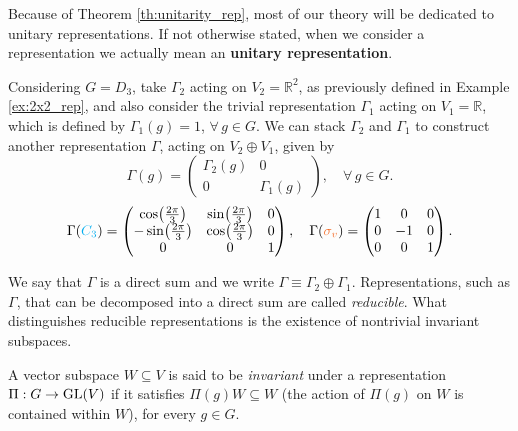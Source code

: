 Because of Theorem \ref{th:unitarity_rep}, most of our theory will be dedicated to unitary representations. If not otherwise stated, when we consider a representation we actually mean an \textbf{unitary representation}.

\begin{example} \label{ex:direct_sum}
Considering $G = D_3$, take $\Gamma_2$ acting on $V_2 = \mathbb{R}^2$, as previously defined in Example \ref{ex:2x2_rep}, and also consider the trivial representation $\Gamma_1$ acting on $V_1 = \mathbb{R}$, which is defined by $\Gamma_1(g) = 1$, $\forall \, g \in G$. We can stack $\Gamma_2$ and $\Gamma_1$ to construct another representation $\Gamma$, acting on $V_2 \oplus V_1$, given by
\begin{equation} \label{eq:block_diagonal_Gamma_2_1}
\Gamma(g) =
\begin{pmatrix}
\Gamma_2(g) & 0 \\
0 & \Gamma_1(g)
\end{pmatrix}, \quad \forall \, g \in G.
\end{equation}
\begin{equation} \label{eq:D6_generators_3x3matrices}
\Gamma(\Ct) =
\begin{pmatrix}
\cos(\frac{2\pi}{3}) & \sin(\frac{2\pi}{3}) & 0 \\
-\sin(\frac{2\pi}{3}) & \cos(\frac{2\pi}{3}) & 0 \\
0 & 0 & 1
\end{pmatrix},
\quad
\Gamma(\sv) =
\begin{pmatrix}
1 & 0 & 0 \\
0 & -1 & 0 \\
0 & 0 & 1
\end{pmatrix}.
\end{equation}

We say that $\Gamma$ is a direct sum and we write $\Gamma \equiv \Gamma_2 \oplus \Gamma_1$. Representations, such as $\Gamma$, that can be decomposed into a direct sum are called \textit{reducible}. What distinguishes reducible representations is the existence of nontrivial invariant subspaces.
\end{example}

\begin{definition} \label{def:invariant_subspace}
A vector subspace $W \subseteq V$ is said to be \textit{invariant} under a representation $\Pi: G \to {\text{GL}}(V)$ if it satisfies $\Pi(g) W \subseteq W$ (the action of $\Pi(g)$ on $W$ is contained within $W$), for every $g \in G$.
\end{definition}

